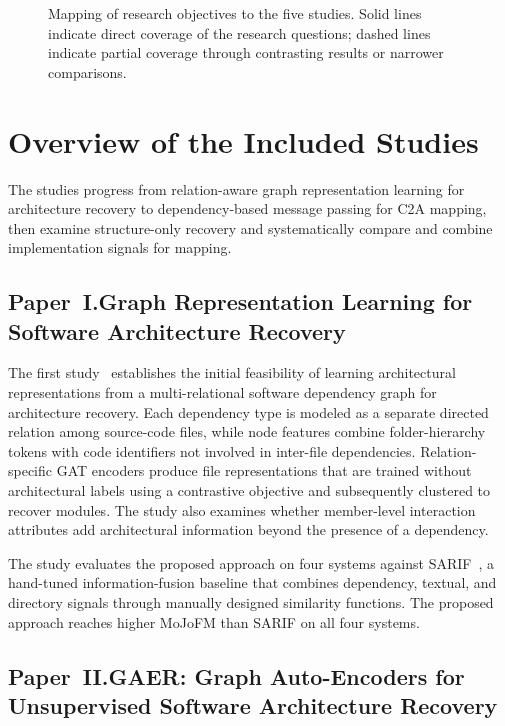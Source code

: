 \begin{figure}[t]
    \centering
    \resizebox{1\textwidth}{!}{}
    \caption[A high-level overview of objectives mapped to the papers.]{Mapping of research objectives to the five studies. Solid lines indicate direct coverage of the research questions; dashed lines indicate partial coverage through contrasting results or narrower comparisons.\label{fig:objective_map}}
\end{figure}

\section{Overview of the Included Studies \label{sec:studies-overview}}
The studies progress from relation-aware graph representation learning for architecture recovery to dependency-based message passing for C2A mapping, then examine structure-only recovery and systematically compare and combine implementation signals for mapping.

\subsection[Paper~I: Architecture Recovery]{Paper~I.\quad Graph Representation Learning for Software Architecture Recovery}
\label{sec:overview-arl}

The first study~\cite{arl_2026} establishes the initial feasibility of learning architectural representations from a multi-relational software dependency graph for architecture recovery. Each dependency type is modeled as a separate directed relation among source-code files, while node features combine folder-hierarchy tokens with code identifiers not involved in inter-file dependencies. Relation-specific GAT encoders produce file representations that are trained without architectural labels using a contrastive objective and subsequently clustered to recover modules. The study also examines whether member-level interaction attributes add architectural information beyond the presence of a dependency.
 
The study evaluates the proposed approach on four systems against SARIF~\cite{sarif}, a hand-tuned information-fusion baseline that combines dependency, textual, and directory signals through manually designed similarity functions. The proposed approach reaches higher MoJoFM than SARIF on all four systems.

\subsection[Paper~II: Architecture Recovery]{Paper~II.\quad GAER: Graph Auto-Encoders for Unsupervised Software Architecture Recovery}
\label{sec:overview-gaer}


